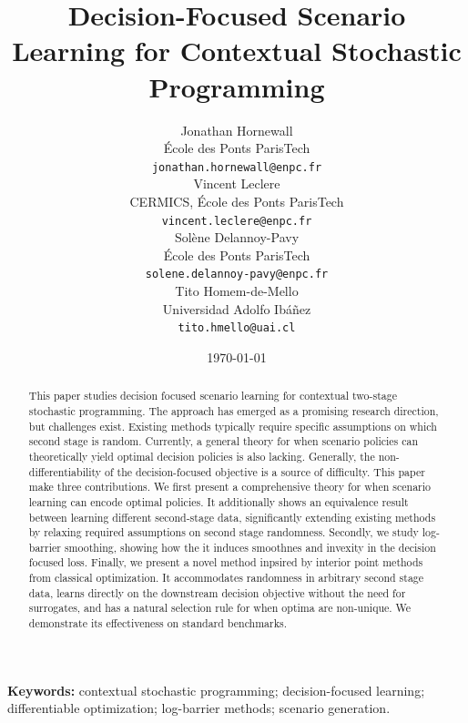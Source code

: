 \documentclass{article}
\title{Decision-Focused Scenario Learning for Contextual Stochastic Programming}
\author{
Jonathan Hornewall \\
École des Ponts ParisTech \\
\texttt{jonathan.hornewall@enpc.fr} \\
\And
Vincent Leclere \\
CERMICS, École des Ponts ParisTech \\
\texttt{vincent.leclere@enpc.fr} \\
\And
Solène Delannoy-Pavy \\
École des Ponts ParisTech \\
\texttt{solene.delannoy-pavy@enpc.fr} \\
\And
Tito Homem-de-Mello \\
Universidad Adolfo Ibáñez \\
\texttt{tito.hmello@uai.cl} \\
}
\date{\today}
\begin{document}
\maketitle

\begin{abstract}
This paper studies decision focused scenario learning for contextual two-stage stochastic programming. The approach has emerged as a promising research direction, but challenges exist. Existing methods typically require specific assumptions on which second stage is random. Currently, a general theory for when scenario policies can theoretically yield optimal decision policies is also lacking. Generally, the non-differentiability of the decision-focused objective is a source of difficulty. This paper make three contributions. We first present a comprehensive theory for when scenario learning can encode optimal policies. It additionally shows an equivalence result between learning different second-stage data, significantly extending existing methods by relaxing required assumptions on second stage randomness. Secondly, we study log-barrier smoothing, showing how the it induces smoothnes and invexity in the decision focused loss. Finally, we present a novel method inpsired by interior point methods from classical optimization. It accommodates randomness in arbitrary second stage data, learns directly on the downstream decision objective without the need for surrogates, and has a natural selection rule for when optima are non-unique. We demonstrate its effectiveness on standard benchmarks.
\end{abstract}

\noindent\textbf{Keywords:} contextual stochastic programming; decision-focused learning; differentiable optimization; log-barrier methods; scenario generation.

\end{document}
